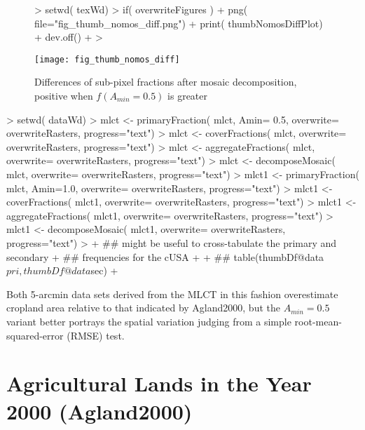 \begin{figure} 
\begin{center}
  
\begin{Schunk}
\begin{Sinput}
> setwd( texWd)
> if( overwriteFigures ) {
+   png( file="fig_thumb_nomos_diff.png")
+   print( thumbNomosDiffPlot)
+   dev.off()
+ }
> 
\end{Sinput}
\end{Schunk}

\texttt{[image: fig\_thumb\_nomos\_diff]}
\end{center} 
\caption{Differences of sub-pixel fractions after mosaic
  decomposition, positive when $f(A_{min} = 0.5)$ is greater}
\label{fig:thumb_diff}
\end{figure} 




\begin{Schunk}
\begin{Sinput}
> setwd( dataWd)
> mlct  <- primaryFraction( mlct, Amin= 0.5, overwrite= overwriteRasters, progress="text")
> mlct  <- coverFractions( mlct, overwrite= overwriteRasters, progress="text")
> mlct  <- aggregateFractions( mlct, overwrite= overwriteRasters, progress="text")
> mlct  <- decomposeMosaic( mlct, overwrite= overwriteRasters, progress="text")
> mlct1  <- primaryFraction( mlct, Amin=1.0, overwrite= overwriteRasters, progress="text")
> mlct1  <- coverFractions( mlct1, overwrite= overwriteRasters, progress="text")
> mlct1  <- aggregateFractions( mlct1, overwrite= overwriteRasters, progress="text")
> mlct1  <- decomposeMosaic( mlct1, overwrite= overwriteRasters, progress="text")
> 
+ ## might be useful to cross-tabulate the primary and secondary
+ ## frequencies for the cUSA
+ 
+ ## table(thumbDf@data$pri, thumbDf@data$sec)
+ 
\end{Sinput}
\end{Schunk}

Both 5-arcmin data sets derived from the MLCT in this fashion
overestimate cropland area relative to that indicated by Agland2000,
but the $A_{min} = 0.5$ variant better portrays the spatial variation
judging from a simple root-mean-squared-error (RMSE)
test. 

\section{Agricultural Lands in the Year 2000 (Agland2000)}
\label{sec:agland2000}

